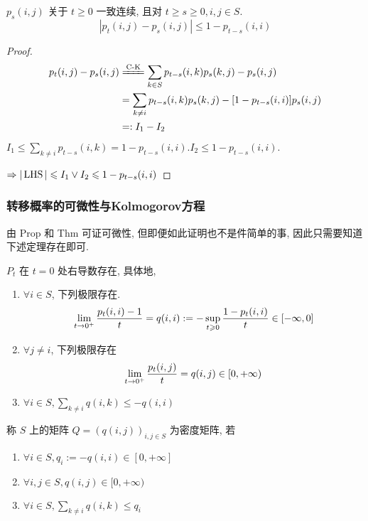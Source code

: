 \begin{theorem}\label{thm:p123-thm1}
    $p_s(i,j)$ 关于 $t\geq 0$ 一致连续, 且对 $t\geq s\geq 0, i,j\in S$.
    \begin{equation}
        |p_t(i,j)-p_s(i,j) |\leq 1-p_{t-s}(i,i)
    \end{equation}
\end{theorem}

\begin{proof}
    \[
    \begin{aligned}
        p_t(i,j)-p_s(i,j) &\xlongequal{\text{C-K}} \sum_{k\in S}p_{t-s}(i,k)p_s(k,j)-p_s(i,j)\\
        &=\sum_{k\neq i}p_{t-s}(i,k) p_s(k,j)-[1-p_{t-s}(i,i)]p_s(i,j)\\
        &=: I_1-I_2
    \end{aligned}
    \]
    $I_1\leq \sum_{k\neq i}p_{t-s}(i,k)=1-p_{t-s}(i,i). I_2\leq 1-p_{t-s}(i,i)$. 

    $\Rightarrow |\operatorname{LHS}|\leqslant I_1\lor I_2\leqslant 1-p_{t-s}(i,i)$
\end{proof}

\subsubsection{转移概率的可微性与Kolmogorov方程}

由 Prop \label{prop:p122-prop1} 和 Thm \label{thm:p123-thm1} 可证可微性, 但即便如此证明也不是件简单的事, 因此只需要知道下述定理存在即可.

\begin{theorem}\label{thm:p124-thm2}
    $P_t$ 在 $t=0$ 处右导数存在, 具体地,
    \begin{enumerate}
        \item $\forall i\in S$, 下列极限存在.
        \[
        \lim_{t \to 0^+}\frac{p_t(i,i)-1}{t}=q(i,i):=-\sup_{t\geqslant 0}\frac{1-p_t(i,i)}{t}\in [-\infty,0]
        \]
        \item $\forall j\neq i$, 下列极限存在
        \[
            \lim_{t \to 0^+}\frac{p_t(i,j)}{t}=q(i,j)\in [0,+\infty)
        \]
        \item $\forall i\in S, \sum_{k\neq i}q(i,k)\leq -q(i,i)$
    \end{enumerate}
\end{theorem}

\begin{definition}
    称 $S$ 上的矩阵 $Q=(q(i,j))_{i,j\in S}$ 为密度矩阵, 若
    \begin{enumerate}
        \item $\forall i\in S,q_i:=-q(i,i)\in [0,+\infty]$
        \item $\forall i,j\in S,q(i,j)\in [0,+\infty)$
        \item $\forall i\in S, \sum_{k\neq i}q(i,k)\leq q_i$
    \end{enumerate}
\end{definition}

